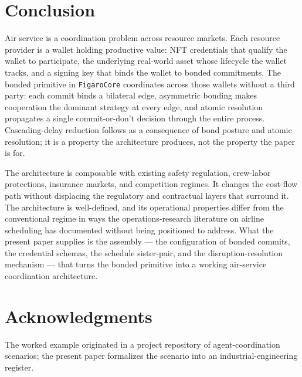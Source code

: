 \documentclass[11pt,a4paper]{article}
\theoremstyle{definition}
\theoremstyle{remark}
\begin{document}
\section{Conclusion}
\label{sec:conclusion}

Air service is a coordination problem across resource markets.
Each resource provider is a wallet holding productive value:
NFT credentials that qualify the wallet to participate, the
underlying real-world asset whose lifecycle the wallet tracks,
and a signing key that binds the wallet to bonded commitments.
The bonded primitive in \texttt{FigaroCore} coordinates across
those wallets without a third party: each commit binds a
bilateral edge, asymmetric bonding makes cooperation the
dominant strategy at every edge, and atomic resolution propagates
a single commit-or-don't decision through the entire process.
Cascading-delay reduction follows as a consequence of bond
posture and atomic resolution; it is a property the architecture
produces, not the property the paper is for.

The architecture is composable with existing safety regulation,
crew-labor protections, insurance markets, and competition
regimes. It changes the cost-flow path without displacing the
regulatory and contractual layers that surround it. The
architecture is well-defined, and its operational properties
differ from the conventional regime in ways the operations-research
literature on airline scheduling has documented without being
positioned to address. What the present paper supplies is the
assembly --- the configuration of bonded commits, the credential
schemas, the schedule sister-pair, and the disruption-resolution
mechanism --- that turns the bonded primitive into a working
air-service coordination architecture.

\section*{Acknowledgments}
The worked example originated in a project repository of
agent-coordination scenarios; the present paper formalizes the
scenario into an industrial-engineering register.
\end{document}
